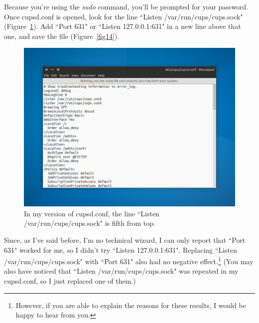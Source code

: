\documentclass[12pt, a4paper]{article}
\begin{document}
\noindent Because you're using the \emph{sudo} command, you'll be prompted for your password.\\

\noindent Once cupsd.conf is opened, look for the line ``Listen /var/run/cups/cups.sock" (Figure~\ref{fig13}). Add ``Port 631" or ``Listen 127.0.0.1:631" in a new line above that one, and save the file (Figure~\ref{fig14}). \\
 
\begin{figure}[!htp]
  \centering
  \includegraphics[width=1\textwidth]{imgs/unable-to-connect-to-server-3.png}
  \caption{In my version of cupsd.conf, the line ``Listen /var/run/cups/cups.sock" is fifth from top.}
  \label{fig13}
\end{figure}

\noindent Since, as I've said before, I'm no technical wizard, I can only report that ``Port 631" worked for me, so I didn't try ``Listen 127.0.0.1:631". Replacing ``Listen /var/run/cups/cups.sock" with ``Port 631" also had no negative effect.\footnote{However, if you are able to explain the reasons for these results, I would be happy to hear from you.} (You may also have noticed that ``Listen /var/run/cups/cups.sock" was repeated in my cupsd.conf, so I just replaced one of them.)
\end{document}
